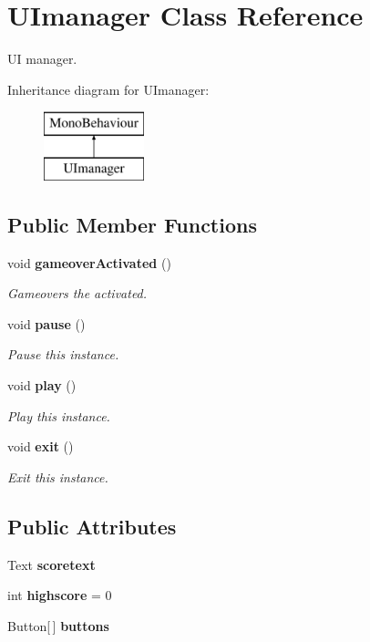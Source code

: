 \section{U\+Imanager Class Reference}
\label{class_u_imanager}


UI manager.  


Inheritance diagram for U\+Imanager\+:\begin{figure}[H]
\begin{center}
\leavevmode
\includegraphics[height=2.000000cm]{class_u_imanager}
\end{center}
\end{figure}
\subsection*{Public Member Functions}
\begin{DoxyCompactItemize}
\item 
void {\bf gameover\+Activated} ()
\begin{DoxyCompactList}\small\item\em Gameovers the activated. \end{DoxyCompactList}\item 
void {\bf pause} ()
\begin{DoxyCompactList}\small\item\em Pause this instance. \end{DoxyCompactList}\item 
void {\bf play} ()
\begin{DoxyCompactList}\small\item\em Play this instance. \end{DoxyCompactList}\item 
void {\bf exit} ()
\begin{DoxyCompactList}\small\item\em Exit this instance. \end{DoxyCompactList}\end{DoxyCompactItemize}
\subsection*{Public Attributes}
\begin{DoxyCompactItemize}
\item 
Text {\bf scoretext}
\item 
int {\bf highscore} = 0
\item 
Button[$\,$] {\bf buttons}
\end{DoxyCompactItemize}
